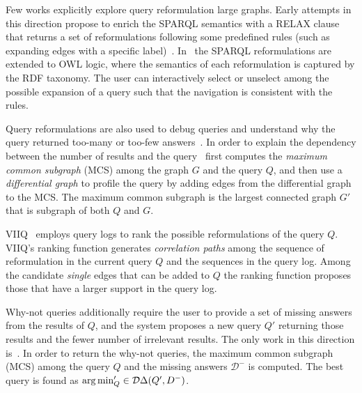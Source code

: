 Few works explicitly explore query reformulation large graphs.
Early attempts in this direction propose to enrich the SPARQL semantics with a \textsc{RELAX} clause that returns a set of reformulations following some predefined rules (such as expanding edges with a specific label)~\citep{hurtado2008query}.
In~\citep{arenas2014faceted} the SPARQL reformulations are extended to OWL logic, where the semantics of each reformulation is captured by the RDF taxonomy. 
The user can interactively select or unselect among the possible expansion of a query such that the navigation is consistent with the rules. 

Query reformulations are also used to debug queries and understand why the query returned too-many or too-few answers~\citep{vasilyeva2016answering}. 
In order to explain the dependency between the number of results and the query~\citep{vasilyeva2016answering} first computes the \emph{maximum common subgraph} (MCS) among the graph $G$ and the query $Q$, and then use a \emph{differential graph} to profile the query by adding edges from the differential graph to the MCS. 
The maximum common subgraph is the largest connected graph $G'$ that is subgraph of both $Q$ and $G$. 

VIIQ~\cite{jayaram2015viiq} employs query logs to rank the possible reformulations of the query $Q$. 
VIIQ's ranking function generates \emph{correlation paths} among the sequence of reformulation in the current query $Q$ and the sequences in the query log. 
Among the candidate \emph{single} edges that can be added to $Q$ the ranking function proposes those that have a larger support in the query log. 



Why-not queries additionally require the user to provide a set of missing answers from the results of $Q$, and the system proposes a new query $Q'$ returning those results and the fewer number of irrelevant results. 
The only work in this direction is~\cite{islam2015efficient}. 
In order to return the why-not queries, the maximum common subgraph (MCS) among the query $Q$ and the missing answers $\mathcal{D}^-$ is computed. The best query is found as $\operatorname*{\arg\min}_Q'\in \mathcal{D}\Delta(Q',D^{-})$. 




